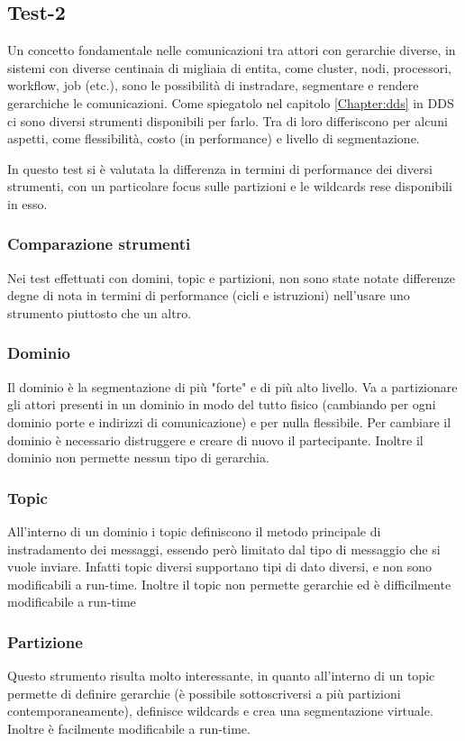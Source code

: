 \subsection{Test-2}
Un concetto fondamentale nelle comunicazioni tra attori con gerarchie diverse, in sistemi con diverse centinaia di migliaia di entita, come cluster, nodi, processori, workflow, job (etc.), sono le possibilità di instradare, segmentare e rendere gerarchiche le comunicazioni. Come spiegatolo nel capitolo \ref{Chapter:dds} in DDS ci sono diversi strumenti disponibili per farlo. Tra di loro differiscono per alcuni aspetti, come flessibilità, costo (in performance) e livello di segmentazione.

In questo test si è valutata la differenza in termini di performance dei diversi strumenti, con un particolare focus sulle partizioni e le wildcards rese disponibili in esso.

\subsubsection{Comparazione strumenti}
Nei test effettuati con domini, topic e partizioni, non sono state notate differenze degne di nota in termini di performance (cicli e istruzioni) nell'usare uno strumento piuttosto che un altro. 

\subsubsection*{Dominio} 
Il dominio è la segmentazione di più "forte" e di più alto livello. Va a partizionare gli attori presenti in un dominio in modo del tutto fisico (cambiando per ogni dominio porte e indirizzi di comunicazione) e per nulla flessibile. Per cambiare il dominio è necessario distruggere e creare di nuovo il partecipante. Inoltre il dominio non permette nessun tipo di gerarchia.
    
\subsubsection*{Topic}
All'interno di un dominio i topic definiscono il metodo principale di instradamento dei messaggi, essendo però limitato dal tipo di messaggio che si vuole inviare. Infatti topic diversi supportano tipi di dato diversi, e non sono modificabili a run-time. %
Inoltre il topic non permette gerarchie ed è difficilmente modificabile a run-time

\subsubsection*{Partizione}
Questo strumento risulta molto interessante, in quanto all'interno di un topic permette di definire gerarchie (è possibile sottoscriversi a più partizioni contemporaneamente), definisce wildcards e crea una segmentazione virtuale. Inoltre è facilmente modificabile a run-time.

